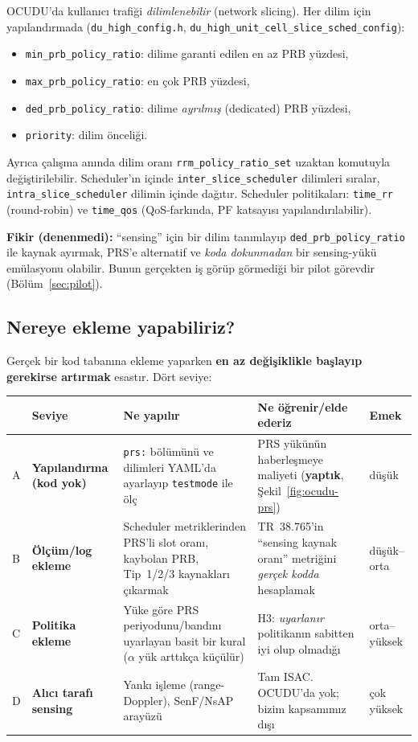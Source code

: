 OCUDU'da kullanıcı trafiği \emph{dilimlenebilir} (network slicing). Her dilim için yapılandırmada (\texttt{du\_high\_config.h}, \texttt{du\_high\_unit\_cell\_slice\_sched\_config}):
\begin{itemize}
\item \texttt{min\_prb\_policy\_ratio}: dilime garanti edilen en az PRB yüzdesi,
\item \texttt{max\_prb\_policy\_ratio}: en çok PRB yüzdesi,
\item \texttt{ded\_prb\_policy\_ratio}: dilime \emph{ayrılmış} (dedicated) PRB yüzdesi,
\item \texttt{priority}: dilim önceliği.
\end{itemize}
Ayrıca çalışma anında dilim oranı \texttt{rrm\_policy\_ratio\_set} uzaktan komutuyla değiştirilebilir. Scheduler'ın içinde \texttt{inter\_slice\_scheduler} dilimleri sıralar, \texttt{intra\_slice\_scheduler} dilimin içinde dağıtır.
Scheduler politikaları: \texttt{time\_rr} (round-robin) ve \texttt{time\_qos} (QoS-farkında, PF katsayısı yapılandırılabilir).

\textbf{Fikir (denenmedi):} ``sensing'' için bir dilim tanımlayıp \texttt{ded\_prb\_policy\_ratio} ile kaynak ayırmak, PRS'e alternatif ve \emph{koda dokunmadan} bir sensing-yükü emülasyonu olabilir.
Bunun gerçekten iş görüp görmediği bir pilot görevdir (Bölüm~\ref{sec:pilot}).

\subsection{Nereye ekleme yapabiliriz?}\label{sec:ekleme}

Gerçek bir kod tabanına ekleme yaparken \textbf{en az değişiklikle başlayıp gerekirse artırmak} esastır. Dört seviye:

\begingroup\sffamily\small
\begin{xltabular}{\textwidth}{@{}p{0.5cm}p{2.9cm}p{3.6cm}Xp{1.5cm}@{}}
\toprule
 & \textbf{Seviye} & \textbf{Ne yapılır} & \textbf{Ne öğrenir/elde ederiz} & \textbf{Emek} \\
\midrule
A & \textbf{Yapılandırma (kod yok)} & \texttt{prs:} bölümünü ve dilimleri YAML'da ayarlayıp \texttt{testmode} ile ölç & PRS yükünün haberleşmeye maliyeti (\textbf{yaptık}, Şekil~\ref{fig:ocudu-prs}) & \textcolor{good}{düşük} \\
B & \textbf{Ölçüm/log ekleme} & Scheduler metriklerinden PRS'li slot oranı, kaybolan PRB, Tip~1/2/3 kaynakları çıkarmak & TR~38.765'in ``sensing kaynak oranı'' metriğini \emph{gerçek kodda} hesaplamak & \textcolor{good}{düşük--orta} \\
C & \textbf{Politika ekleme} & Yüke göre PRS periyodunu/bandını uyarlayan basit bir kural ($\alpha$ yük arttıkça küçülür) & H3: \emph{uyarlanır} politikanın sabitten iyi olup olmadığı & \textcolor{warn}{orta--yüksek} \\
D & \textbf{Alıcı tarafı sensing} & Yankı işleme (range-Doppler), SenF/NsAP arayüzü & Tam ISAC. OCUDU'da yok; bizim kapsamımız dışı & \textcolor{bad}{çok yüksek} \\
\bottomrule
\end{xltabular}
\endgroup

